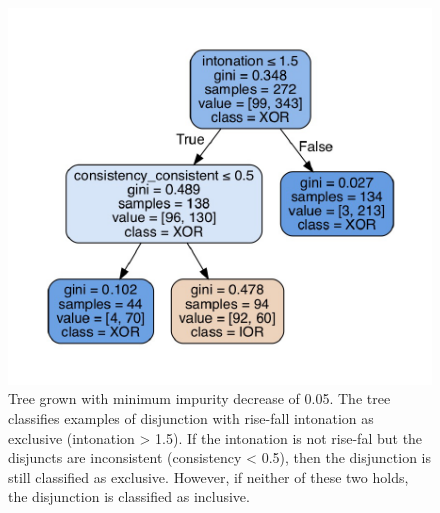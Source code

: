 \documentclass[oneside]{report}
\theoremstyle{definition}
\theoremstyle{definition}
\theoremstyle{definition}
\theoremstyle{remark}
\begin{document}
\begin{figure}
\centering
\includegraphics{figs/binaryLowFeatures-1.pdf}
\caption{\label{fig:binaryLowFeatures}Tree grown with minimum impurity
decrease of 0.05. The tree classifies examples of disjunction with
rise-fall intonation as exclusive (intonation \textgreater{} 1.5). If
the intonation is not rise-fal but the disjuncts are inconsistent
(consistency \textless{} 0.5), then the disjunction is still classified
as exclusive. However, if neither of these two holds, the disjunction is
classified as inclusive.}
\end{figure}
\end{document}
